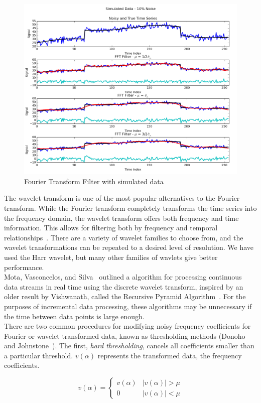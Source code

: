 \documentclass[11pt]{article}
\theoremstyle{definition}
\begin{document}
\begin{figure}
\centering
\includegraphics[width = 0.75 \textwidth]{FFTCompare.png}
\caption{Fourier Transform Filter with simulated data}
\label{fftcompare}
\end{figure}

The wavelet transform is one of the most popular alternatives to the Fourier transform. While the Fourier transform completely transforms the time series into the frequency domain, the wavelet transform offers both frequency and time information. This allows for filtering both by frequency and temporal relationships~\cite{Graps95}. There are a variety of wavelet families to choose from, and the wavelet transformations can be repeated to a desired level of resolution. We have used the Harr wavelet, but many other families of wavlets give better performance.\\

Mota, Vasconcelos, and Silva~\cite{Mota05} outlined a algorithm for processing continuous data streams in real time using the discrete wavelet transform, inspired by an older result by Vishwanath, called the Recursive Pyramid Algorithm~\cite{Vishwanath94}. For the purposes of incremental data processing, these algorithms may be unnecessary if the time between data points is large enough.\\

There are two common procedures for modifying noisy frequency coefficients for Fourier or wavelet transformed data, known as thresholding methods (Donoho and Johnstone~\cite{Donoho94}). The first, \textit{hard thresholding}, cancels all coefficients smaller than a particular threshold. $v\left(\alpha\right)$ represents the transformed data, the frequency coefficients.

\begin{displaymath}
v\left(\alpha\right) = 
\begin{cases}
v\left(\alpha\right) & \lvert v\left(\alpha\right)\rvert > \mu \\
0 & \lvert v\left(\alpha\right)\rvert < \mu
\end{cases}
\end{displaymath}
\end{document}
